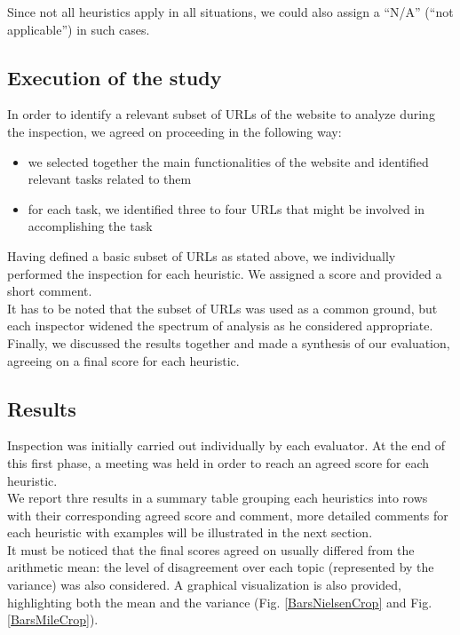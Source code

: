 Since not all heuristics apply in all situations, we could also assign a ``N/A'' (``not applicable'') in such cases.

\subsection{Execution of the study}
In order to identify a relevant subset of URLs of the website to analyze during the inspection, we agreed on proceeding in the following way:
\begin{itemize}
    \item we selected together the main functionalities of the website and identified relevant tasks related to them
    \item for each task, we identified three to four URLs that might be involved in accomplishing the task    
\end{itemize}
Having defined a basic subset of URLs as stated above, we individually performed the inspection for each heuristic. We assigned a score and provided a short comment. \\
It has to be noted that the subset of URLs was used as a common ground, but each inspector widened the spectrum of analysis as he considered appropriate.\\
Finally, we discussed the results together and made a synthesis of our evaluation, agreeing on a final score for each heuristic.   


\pagebreak

\subsection{Results}
Inspection was initially carried out individually by each evaluator. At the end of this first phase, a meeting was held in order to reach an agreed score for each heuristic.\\
We report thre results in a summary table grouping each heuristics into rows with their corresponding agreed score and comment, more detailed comments for each heuristic with examples will be illustrated in the next section.\\
It must be noticed that the final scores agreed on usually differed from the arithmetic mean: the level of disagreement over each topic (represented by the variance) was also considered. A graphical visualization is also provided, highlighting both the mean and the variance (Fig. \ref{BarsNielsenCrop} and Fig. \ref{BarsMileCrop}).

